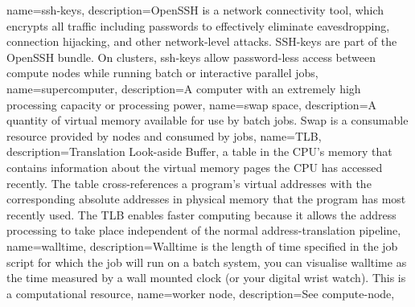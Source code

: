 {
  name={ssh-keys},
  description={OpenSSH is a network connectivity tool, which encrypts all traffic including passwords to effectively eliminate eavesdropping, connection hijacking, and other network-level attacks. SSH-keys are part of the OpenSSH bundle. On \hpc clusters, ssh-keys allow password-less access between compute nodes while running batch or interactive parallel jobs},
}
{
  name={supercomputer},
  description={A computer with an extremely high processing capacity or processing power},
}
{
  name={swap space},
  description={A quantity of virtual memory available for use by batch jobs. Swap is a consumable resource provided by nodes and consumed by jobs},
}
{
  name={TLB},
  description={Translation Look-aside Buffer, a table in the CPU's memory that contains information about the virtual memory pages the CPU has accessed recently. The table cross-references a program's virtual addresses with the corresponding absolute addresses in physical memory that the program has most recently used. The TLB enables faster computing because it allows the address processing to take place independent of the normal address-translation pipeline},
}
{
  name={walltime},
  description={Walltime is the length of time specified in the job script for which the job will run on a batch system, you can visualise walltime as the time measured by a wall mounted clock (or your digital wrist watch). This is a computational resource},
}
{
  name={worker node},
  description={See \gls{compute-node}},
}

